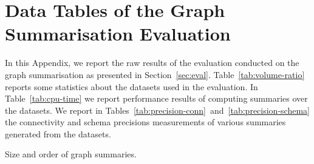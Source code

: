 \chapter{Data Tables of the Graph Summarisation Evaluation}

In this Appendix, we report the raw results of the evaluation conducted on the graph summarisation as presented in Section~\ref{sec:eval}. Table~\ref{tab:volume-ratio} reports some statistics about the datasets used in the evaluation. In Table~\ref{tab:cpu-time} we report performance results of computing summaries over the datasets. We report in Tables~\ref{tab:precision-conn}~and~\ref{tab:precision-schema} the connectivity and schema precisions measurements of various summaries generated from the datasets.

\begin{table}
	\centering
	\resizebox{\textwidth}{!}{
		
	}
	\caption{Size and order of graph summaries.}
	\label{tab:volume-ratio}
\end{table}

\begin{table}
	\centering
	\resizebox{\textwidth}{!}{
		
	}
	\caption{Performance comparison. We report the CPU time in $ms$ of the \emph{edges} step in the graph summarisation computation. For each category of dataset complexity, we report the mean $\mu$ of the CPU time.%
	}
	\label{tab:cpu-time}
\end{table}





